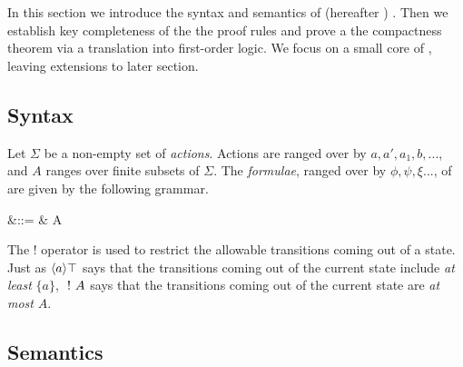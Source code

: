 \section{\ELFULL}\label{coreEL}

In this section we introduce the syntax and semantics of \ELFULL{} (hereafter \ELABR{}) .
Then we establish key completeness of the the proof rules and prove a
the compactness theorem via a translation into first-order logic. We
focus on a small core of \ELABR{}, leaving extensions to later
section.

\subsection{Syntax}



\begin{definition} Let $\Sigma$ be a non-empty set of \emph{actions}.
Actions are ranged over by $a, a', a_1, b, ...$, and $A$ ranges over
finite subsets of $\Sigma$. The \emph{formulae}, ranged over by $\phi,
\psi, \xi ...$, of \ELABR{} are given by the
following grammar.

\begin{GRAMMAR}
  \phi 
     &\quad ::= \quad & 
  \TRUE 
     \VERTICAL 
  \phi \AND \psi
     \VERTICAL 
     \VERTICAL 
  \fBang A 
\end{GRAMMAR}

\NI The $!$ operator is used to restrict the allowable transitions
coming out of a state.  
Just as $\langle a \rangle \top$ says that the transitions coming out of the current state include \emph{at least} $\{a\}$,
$\ ! \  A$ says that the transitions coming out of the current state are \emph{at most} $A$.


\end{definition}

\subsection{Semantics}

